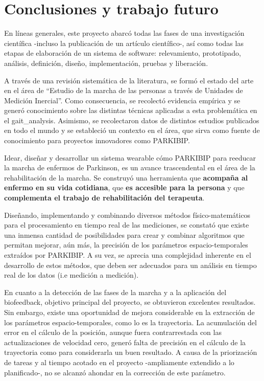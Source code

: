 \chapter{Conclusiones y trabajo futuro}\label{chap:conclusions}


En líneas generales, este proyecto abarcó todas las fases de una investigación científica -incluso la publicación de un artículo científico-,  así como todas las etapas de elaboración de un sistema de software: relevamiento, prototipado, análisis, definición, diseño, implementación, pruebas y liberación. 


A través de una revisión sistemática de la literatura, se formó el estado del arte en el área de ``Estudio de la marcha de las personas a través de Unidades de Medición Inercial''. Como consecuencia, se recolectó evidencia empírica y se generó conocimiento sobre las distintas técnicas aplicadas a esta problemática en el \gls{gait_analysis}. Asimismo, se recolectaron datos de distintos estudios publicados en todo el mundo y se estableció un contexto en el área, que sirva como fuente de conocimiento para proyectos innovadores como PARKIBIP. 

Idear, diseñar y desarrollar un sistema wearable cómo PARKIBIP para reeducar la marcha de enfermos de Parkinson, es un avance trascendental en el área de la rehabilitación de la marcha. Se construyó una herramienta que \textbf{acompaña al enfermo en su vida cotidiana}, que \textbf{es accesible para la persona} y que \textbf{complementa el trabajo de rehabilitación del terapeuta}.


Diseñando, implementando y combinando diversos métodos físico-matemáticos para el procesamiento en tiempo real de las mediciones, se constató que existe una inmensa cantidad de posibilidades para crear y combinar algoritmos que permitan mejorar, aún más, la precisión de los parámetros espacio-temporales extraídos por PARKIBIP. A su vez, se aprecia una complejidad inherente en el desarrollo de estos métodos, que deben ser adecuados para un análisis en tiempo real de los datos (i.e medición a medición).

En cuanto a la detección de las fases de la marcha y a la aplicación del biofeedback, objetivo principal del proyecto, se obtuvieron excelentes resultados. Sin embargo, existe una oportunidad de mejora considerable en la extracción de los parámetros espacio-temporales, como lo es la trayectoria. La acumulación del error en el cálculo de la posición, aunque fuera contrarrestada con las actualizaciones de velocidad cero, generó falta de precisión en el cálculo de la trayectoria como para considerarla un buen resultado. A causa de la priorización de tareas y al tiempo acotado en el proyecto -ampliamente extendido a lo planificado-, no se alcanzó ahondar en la corrección de este parámetro.

